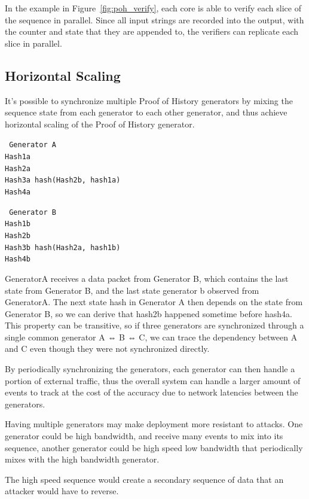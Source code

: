 \documentclass[12pt]{article}
\begin{document}
In the example in Figure~\ref{fig:poh_verify}, each core is able to verify each slice of the sequence in parallel.  Since all input strings are recorded into the output, with the counter and state that they are appended to, the verifiers can replicate each slice in parallel.

\subsection{Horizontal Scaling}
It’s possible to synchronize multiple Proof of History generators by mixing the sequence state from each generator to each other generator, and thus achieve horizontal scaling of the Proof of History generator.

\texttt{
Generator A\\
Hash1a\\
Hash2a\\
Hash3a hash(Hash2b, hash1a)\\
Hash4a\\
}

\texttt{
Generator B\\
Hash1b\\
Hash2b\\
Hash3b hash(Hash2a, hash1b)\\
Hash4b\\
}

GeneratorA receives a data packet from Generator B, which contains the last state from Generator B, and the last state generator b observed from GeneratorA.  The next state hash in Generator A then depends on the state from Generator B, so we can derive that hash2b happened sometime before hash4a.  This property can be transitive, so if three generators are synchronized through a single common generator A ⇔ B ⇔ C, we can trace the dependency between A and C even though they were not synchronized directly.

By periodically synchronizing the generators, each generator can then handle a portion of external traffic, thus the overall system can handle a larger amount of events to track at the cost of the accuracy due to network latencies between the generators.

Having multiple generators may make deployment more resistant to attacks.  One generator could be high bandwidth, and receive many events to mix into its sequence, another generator could be high speed low bandwidth that periodically mixes with the high bandwidth generator.

The high speed sequence would create a secondary sequence of data that an attacker would have to reverse.
\end{document}
